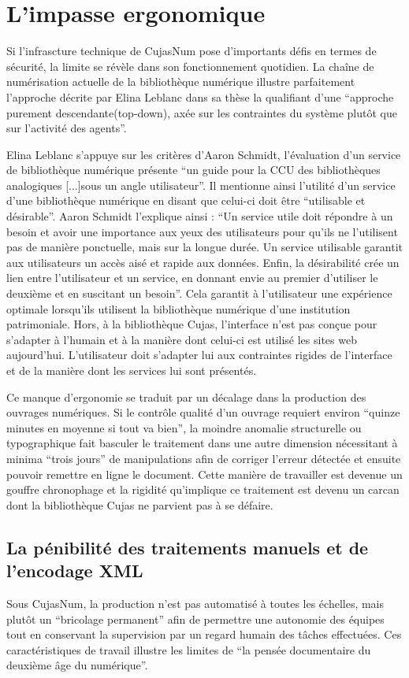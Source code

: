 \section{L'impasse ergonomique}
Si l'infrascture technique de CujasNum pose d'importants défis en termes de sécurité, la limite se révèle dans son fonctionnement quotidien. La chaîne de numérisation actuelle de la bibliothèque numérique illustre parfaitement l'approche décrite par Elina Leblanc dans sa thèse la qualifiant d'une \enquote{approche purement descendante(top-down), axée sur les contraintes du système plutôt que sur l'activité des agents}.

Elina Leblanc s'appuye sur les critères d'Aaron Schmidt, l'évaluation d'un service de bibliothèque numérique présente \enquote{un guide pour la CCU des bibliothèques analogiques [...]sous un angle utilisateur}. Il mentionne ainsi l'utilité d'un service d'une bibliothèque numérique en disant que celui-ci doit être \enquote{utilisable et désirable}. Aaron Schmidt l'explique ainsi : \enquote{Un service utile doit répondre à un besoin et avoir une importance aux yeux des utilisateurs pour qu'ils ne l'utilisent pas de manière ponctuelle, mais sur la longue durée. Un service utilisable garantit aux utilisateurs un accès aisé et rapide aux données. Enfin, la désirabilité crée un lien entre l'utilisateur et un service, en donnant envie au premier d'utiliser le deuxième et en suscitant un besoin}. Cela garantit à l'utilisateur une expérience optimale lorsqu'ils utilisent la bibliothèque numérique d'une institution patrimoniale. Hors, à la bibliothèque Cujas, l'interface n'est pas conçue pour s'adapter à l'humain et à la manière dont celui-ci est utilisé les sites web aujourd'hui. L'utilisateur doit s'adapter lui aux contraintes rigides de l'interface et de la manière dont les services lui sont présentés. 

Ce manque d'ergonomie se traduit par un décalage dans la production des ouvrages numériques. Si le contrôle qualité d'un ouvrage requiert environ \enquote{quinze minutes en moyenne si tout va bien}, la moindre anomalie structurelle ou typographique fait basculer le traitement dans une autre dimension nécessitant à minima \enquote{trois jours} de manipulations afin de corriger l'erreur détectée et ensuite pouvoir remettre en ligne le document. Cette manière de travailler est devenue un gouffre chronophage et la rigidité qu'implique ce traitement est devenu un carcan dont la bibliothèque Cujas ne parvient pas à se défaire.

\subsection{La pénibilité des traitements manuels et de l'encodage XML}
Sous CujasNum, la production n'est pas automatisé à toutes les échelles, mais plutôt un \enquote{bricolage permanent} afin de permettre une autonomie des équipes tout en conservant la supervision par un regard humain des tâches effectuées. Ces caractéristiques de travail illustre les limites de \enquote{la pensée documentaire du deuxième âge du numérique}. 

